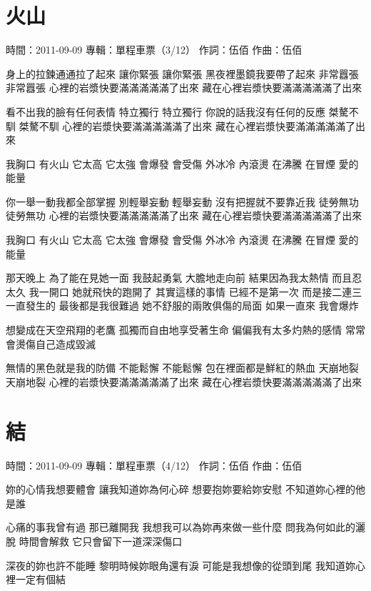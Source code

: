 \documentclass[UTF8,a4paper,oneside,twocolumn,12pt]{ctexbook}
\newcommand{\infopair}[2]{\textbullet #1：#2}
\newcommand{\zc}[1][伍佰]{\infopair{作詞}{#1}}
\newcommand{\zq}[1][伍佰]{\infopair{作曲}{#1}}
\newcommand{\zj}[1]{\infopair{專輯}{#1}}
\newcommand{\sj}[1]{\infopair{時間}{#1}}
\newenvironment{info}{\begin{flushleft}\kaishu
	}
	{\end{flushleft}\normalsize\yahei\par}
\newenvironment{lyric}{
	}
{}
\begin{document}
\section{火山}
\begin{info}
	\sj{2011-09-09}
	\zj{單程車票（3/12）}
	\zc
	\zq
\end{info}
\begin{lyric}
	身上的拉鍊通通拉了起來
	讓你緊張 讓你緊張
	黑夜裡墨鏡我要帶了起來
	非常囂張 非常囂張
	心裡的岩漿快要滿滿滿滿滿了出來
	藏在心裡岩漿快要滿滿滿滿滿了出來

	看不出我的臉有任何表情
	特立獨行 特立獨行
	你說的話我沒有任何的反應
	桀驁不馴 桀驁不馴
	心裡的岩漿快要滿滿滿滿滿了出來
	藏在心裡岩漿快要滿滿滿滿滿了出來

	我胸口 有火山 它太高 它太強
	會爆發 會受傷 外冰冷 內滾燙
	在沸騰 在冒煙 愛的能量

	你一舉一動我都全部掌握
	別輕舉妄動 輕舉妄動
	沒有把握就不要靠近我
	徒勞無功 徒勞無功
	心裡的岩漿快要滿滿滿滿滿了出來
	藏在心裡岩漿快要滿滿滿滿滿了出來

	我胸口 有火山 它太高 它太強
	會爆發 會受傷 外冰冷 內滾燙
	在沸騰 在冒煙 愛的能量

	那天晚上 為了能在見她一面
	我鼓起勇氣 大膽地走向前
	結果因為我太熱情 而且忍太久
	我一開口 她就飛快的跑開了
	其實這樣的事情 已經不是第一次
	而是接二連三一直發生的
	最後都是我很難過
	她不舒服的兩敗俱傷的局面
	如果一直來 我會爆炸

	想變成在天空飛翔的老鷹
	孤獨而自由地享受著生命
	偏偏我有太多灼熱的感情
	常常會燙傷自己造成毀滅

	無情的黑色就是我的防備
	不能鬆懈 不能鬆懈
	包在裡面都是鮮紅的熱血
	天崩地裂 天崩地裂
	心裡的岩漿快要滿滿滿滿滿了出來
	藏在心裡岩漿快要滿滿滿滿滿了出來
\end{lyric}

\section{結}
\begin{info}
	\sj{2011-09-09}
	\zj{單程車票（4/12）}
	\zc
	\zq
\end{info}
\begin{lyric}
	妳的心情我想要體會
	讓我知道妳為何心碎
	想要抱妳要給妳安慰
	不知道妳心裡的他是誰

	心痛的事我曾有過 那已離開我
	我想我可以為妳再來做一些什麼
	問我為何如此的灑脫 時間會解救
	它只會留下一道深深傷口

	深夜的妳也許不能睡
	黎明時候妳眼角還有淚
	可能是我想像的從頭到尾
	我知道妳心裡一定有個結
\end{lyric}
\end{document}
